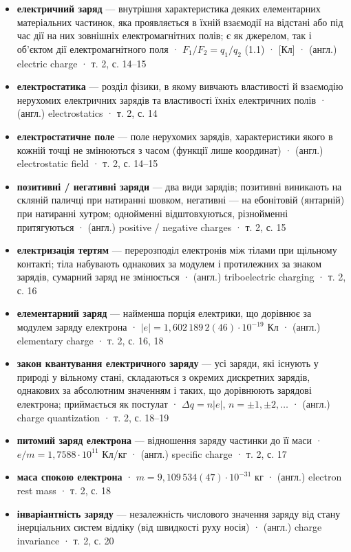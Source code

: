 \documentclass[11pt,a4paper,oneside]{book}
\newcommand{\book}{}
\begin{document}
\begin{itemize}
\item \textbf{електричний заряд} — внутрішня характеристика деяких елементарних матеріальних частинок, яка проявляється в їхній взаємодії на відстані або під час дії на них зовнішніх електромагнітних полів; є як джерелом, так і об'єктом дії електромагнітного поля · $F_1/F_2 = q_1/q_2$ (1.1) · [Кл] · (англ.) electric charge · \book{} т. 2, с. 14–15
\item \textbf{електростатика} — розділ фізики, в якому вивчають властивості й взаємодію нерухомих електричних зарядів та властивості їхніх електричних полів · (англ.) electrostatics · \book{} т. 2, с. 14
\item \textbf{електростатичне поле} — поле нерухомих зарядів, характеристики якого в кожній точці не змінюються з часом (функції лише координат) · (англ.) electrostatic field · \book{} т. 2, с. 14–15
\item \textbf{позитивні / негативні заряди} — два види зарядів; позитивні виникають на скляній паличці при натиранні шовком, негативні — на ебонітовій (янтарній) при натиранні хутром; однойменні відштовхуються, різнойменні притягуються · (англ.) positive / negative charges · \book{} т. 2, с. 15
\item \textbf{електризація тертям} — перерозподіл електронів між тілами при щільному контакті; тіла набувають однакових за модулем і протилежних за знаком зарядів, сумарний заряд не змінюється · (англ.) triboelectric charging · \book{} т. 2, с. 16
\item \textbf{елементарний заряд} — найменша порція електрики, що дорівнює за модулем заряду електрона · $|e| = 1{,}602\,189\,2(46)\cdot10^{-19}$ Кл · (англ.) elementary charge · \book{} т. 2, с. 16, 18
\item \textbf{закон квантування електричного заряду} — усі заряди, які існують у природі у вільному стані, складаються з окремих дискретних зарядів, однакових за абсолютним значенням і таких, що дорівнюють зарядові електрона; приймається як постулат · $\Delta q = n|e|$, $n = \pm1, \pm2, \ldots$ · (англ.) charge quantization · \book{} т. 2, с. 18–19
\item \textbf{питомий заряд електрона} — відношення заряду частинки до її маси · $e/m = 1{,}7588\cdot10^{11}$ Кл/кг · (англ.) specific charge · \book{} т. 2, с. 17
\item \textbf{маса спокою електрона} · $m = 9{,}109\,534(47)\cdot10^{-31}$ кг · (англ.) electron rest mass · \book{} т. 2, с. 18
\item \textbf{інваріантність заряду} — незалежність числового значення заряду від стану інерціальних систем відліку (від швидкості руху носія) · (англ.) charge invariance · \book{} т. 2, с. 20

\end{itemize}
\end{document}
